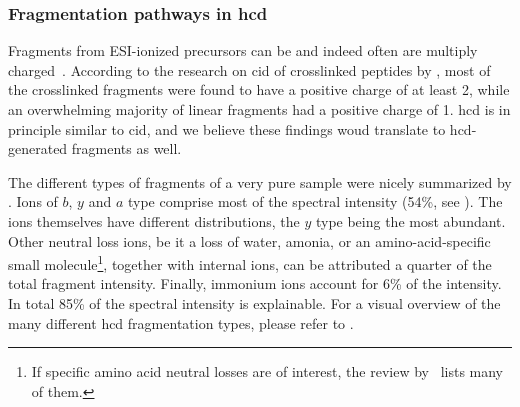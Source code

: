 \subsubsection{Fragmentation pathways in \gls*{hcd}}

Fragments from ESI-ionized precursors can be and indeed often are multiply charged~\cite{katta1991use, michalski2012systematic}. According to the research on \gls*{cid} of crosslinked peptides by \citet{giese2016study}, most of the crosslinked fragments were found to have a positive charge of at least 2, while an overwhelming majority of linear fragments had a positive charge of 1. \gls*{hcd} is in principle similar to \gls*{cid}, and we believe these findings woud translate to \gls*{hcd}-generated fragments as well.

The different types of fragments of a very pure sample were nicely summarized by \citet{michalski2012systematic}. Ions of \(b\), \(y\) and \(a\) type comprise most of the spectral intensity (54\%, see ). The ions themselves have different distributions, the \(y\) type being the most abundant. Other neutral loss ions, be it a loss of water, amonia, or an amino-acid-specific small molecule\footnote{If specific amino acid neutral losses are of interest, the review by~\citet{paizs2005fragmentation} lists many of them.}, together with internal ions, can be attributed a quarter of the total fragment intensity. Finally, immonium ions account for 6\% of the intensity. In total 85\% of the spectral intensity is explainable. For a visual overview of the many different \gls*{hcd} fragmentation types, please refer to .

